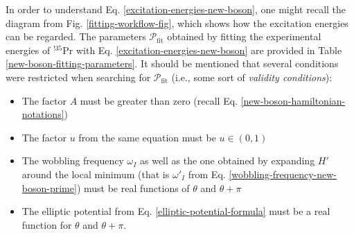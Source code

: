 In order to understand Eq. \ref{excitation-energies-new-boson}, one might recall the diagram from Fig. \ref{fitting-workflow-fig}, which shows how the excitation energies can be regarded. The parameters $\mathcal{P}_\text{fit}$ obtained by fitting the experimental energies of $^{!35}$Pr with Eq. \ref{excitation-energies-new-boson} are provided in Table \ref{new-boson-fitting-parameters}. It should be mentioned that several conditions were restricted when searching for $\mathcal{P}_\text{fit}$ (i.e., some sort of \emph{validity conditions}):
\begin{itemize}
    \item The factor $A$ must be greater than zero (recall Eq. \ref{new-boson-hamiltonian-notations})
    \item The factor $u$ from the same equation must be $u\in(0,1)$
    \item The wobbling frequency $\omega_I$ as well as the one obtained by expanding $H'$ around the local minimum (that is $\omega'_I$ from Eq. \ref{wobbling-frequency-new-boson-prime}) must be real functions of $\theta$ and $\theta+\pi$
    \item The elliptic potential from Eq. \ref{elliptic-potential-formula} must be a real function for $\theta$ and $\theta+\pi$.
\end{itemize}
\begin{table}
    \centering
    \caption{The four free parameters obtained by fitting the experimental energies of $^{135}$Pr (taken from Ref. \cite{matta2017transverse}) using the set of energies from Eq. \ref{excitation-energies-new-boson}. For the moments of inertia, the unit is $\hbar^2\text{MeV}^{-1}$.}
    \label{new-boson-fitting-parameters}
\end{table}

